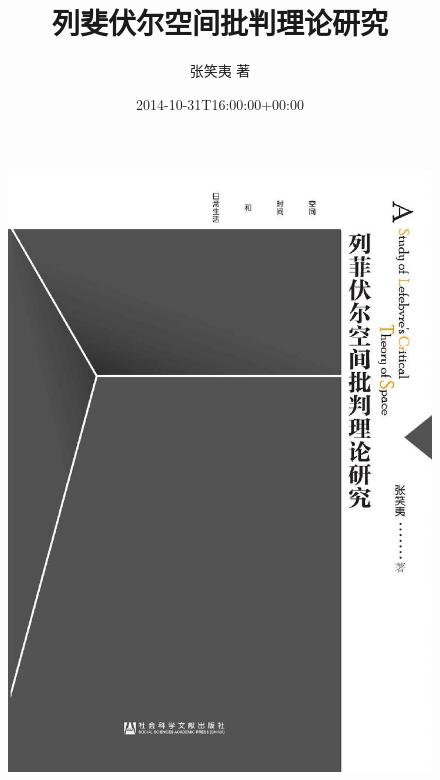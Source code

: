 \documentclass[UTF8, fontset = sourcesans, a4paper, oneside, zihao =
-4, scheme=chinese, no-math, space=true]{ctexbook}
\title{列斐伏尔空间批判理论研究}
\author{张笑夷 著}
\date{2014-10-31T16:00:00+00:00}
\makeatletter
\def\maxwidth{\ifdim\Gin@nat@width>\linewidth\linewidth
\else\Gin@nat@width\fi}
\let\Oldincludegraphics\includegraphics
\renewcommand{\includegraphics}[1]{\Oldincludegraphics[width=\maxwidth]{#1}}
\makeatother
\begin{document}
\maketitle

\protect\hypertarget{titlepage.xhtml}{}{}

\protect\hypertarget{part0000.html}{}{}

\begin{figure}[!tbp]
  \centering
\includegraphics{images/00001.jpeg}
\end{figure}

\protect\hypertarget{part0001.html}{}{}
\end{document}
